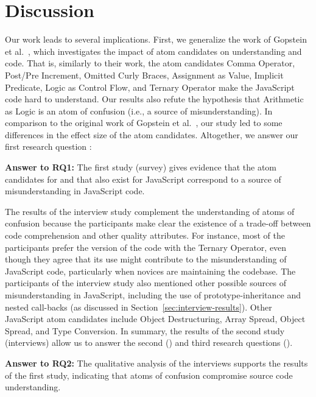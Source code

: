 \section{Discussion}
\label{sec:discussion}

Our work leads to several implications.
First, we generalize the
work of Gopstein et al.~\cite{DBLP:conf/sigsoft/GopsteinIYDZYC17},
which investigates
the impact of atom candidates on
understanding \clang and \cpplang code. That is,
similarly to their work, the atom candidates
Comma Operator, Post/Pre Increment, Omitted Curly Braces,
Assignment as Value, Implicit Predicate, Logic as
Control Flow, and Ternary Operator make the 
JavaScript code hard to understand. Our results also 
refute the hypothesis that Arithmetic as Logic is an atom of
confusion (i.e., a source of misunderstanding).
In comparison to the original
work of Gopstein et al.~\cite{DBLP:conf/sigsoft/GopsteinIYDZYC17}, 
our study
led to some differences in the effect size
of the atom candidates.
Altogether, we answer our first research question
\emph{\rqa}:

\begin{mh}
  {\bf Answer to RQ1:} The first study (survey) gives evidence that
  the atom candidates for \clang and \cpplang
  that also exist for JavaScript correspond to
  a source of misunderstanding in
  JavaScript code. 
\end{mh}

The results of the interview study complement the understanding
of atoms of confusion because the participants make
clear the existence of a trade-off between code comprehension
and other quality attributes. For instance, most of the participants
prefer the version of the code with the Ternary Operator,
even though they agree that its use might contribute to the
misunderstanding of JavaScript code, particularly when novices are maintaining
the codebase. The participants of the interview study also
mentioned other possible sources of misunderstanding in JavaScript,
including the use of prototype-inheritance and nested call-backs (as discussed in Section~\ref{sec:interview-results}). Other JavaScript atom candidates include
Object Destructuring, Array Spread, Object Spread, and Type Conversion.
In summary, the results of the second study (interviews) allow
us to answer the second (\rqb) and third research questions
(\emph{\rqc}).

\begin{mh}
  {\bf Answer to RQ2:} The qualitative analysis of the
  interviews supports the results of the first study,
  indicating that atoms of confusion compromise
  source code understanding. 
\end{mh}

